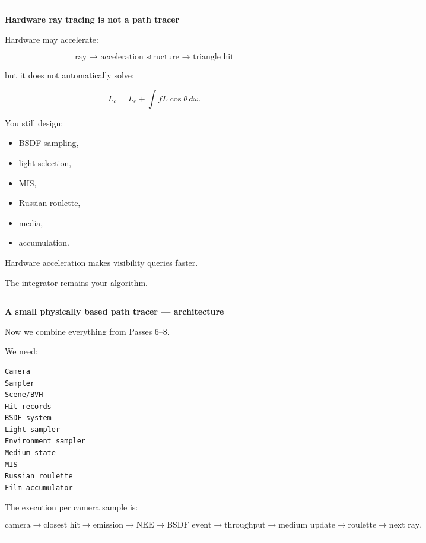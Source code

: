 \begin{center}\rule{0.5\linewidth}{0.5pt}\end{center}

\textbf{Hardware ray tracing is not a path tracer}

Hardware may accelerate:

\[
\boxed{
\text{ray → acceleration structure → triangle hit}
}
\]

but it does not automatically solve:

\[
L_o=
L_e+
\int fL\cos\theta\,d\omega.
\]

You still design:

\begin{itemize}
\tightlist
\item
  BSDF sampling,
\item
  light selection,
\item
  MIS,
\item
  Russian roulette,
\item
  media,
\item
  accumulation.
\end{itemize}

Hardware acceleration makes visibility queries faster.

The integrator remains your algorithm.

\begin{center}\rule{0.5\linewidth}{0.5pt}\end{center}

\textbf{A small physically based path tracer --- architecture}

Now we combine everything from Passes 6--8.

We need:

\begin{verbatim}
Camera
Sampler
Scene/BVH
Hit records
BSDF system
Light sampler
Environment sampler
Medium state
MIS
Russian roulette
Film accumulator
\end{verbatim}

The execution per camera sample is:

\[
\text{camera}
\rightarrow
\text{closest hit}
\rightarrow
\text{emission}
\rightarrow
\text{NEE}
\rightarrow
\text{BSDF event}
\rightarrow
\text{throughput}
\rightarrow
\text{medium update}
\rightarrow
\text{roulette}
\rightarrow
\text{next ray}.
\]

\begin{center}\rule{0.5\linewidth}{0.5pt}\end{center}

